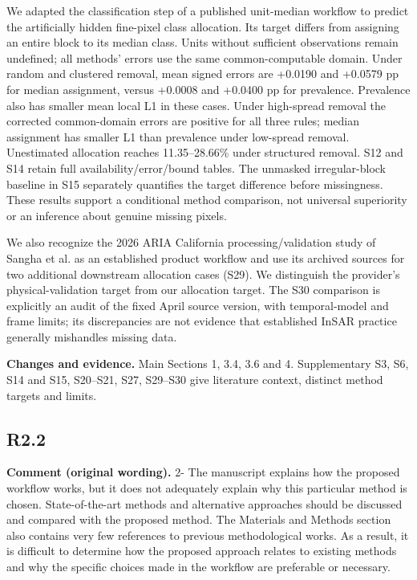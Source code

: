 \documentclass[11pt,a4paper]{article}
\begin{document}
We adapted the classification step of a published unit-median workflow to predict the artificially hidden fine-pixel class allocation. Its target differs from assigning an entire block to its median class. Units without sufficient observations remain undefined; all methods' errors use the same common-computable domain. Under random and clustered removal, mean signed errors are +0.0190 and +0.0579 pp for median assignment, versus +0.0008 and +0.0400 pp for prevalence. Prevalence also has smaller mean local L1 in these cases. Under high-spread removal the corrected common-domain errors are positive for all three rules; median assignment has smaller L1 than prevalence under low-spread removal. Unestimated allocation reaches 11.35--28.66\% under structured removal. S12 and S14 retain full availability/error/bound tables. The unmasked irregular-block baseline in S15 separately quantifies the target difference before missingness. These results support a conditional method comparison, not universal superiority or an inference about genuine missing pixels.

We also recognize the 2026 ARIA California processing/validation study of Sangha et al. as an established product workflow and use its archived sources for two additional downstream allocation cases (S29). We distinguish the provider's physical-validation target from our allocation target. The S30 comparison is explicitly an audit of the fixed April source version, with temporal-model and frame limits; its discrepancies are not evidence that established InSAR practice generally mishandles missing data.

\textbf{Changes and evidence.} Main Sections 1, 3.4, 3.6 and 4. Supplementary S3, S6, S14 and S15, S20--S21, S27, S29--S30 give literature context, distinct method targets and limits.

\subsection*{R2.2}

\textbf{Comment (original wording).} 2- The manuscript explains how the proposed workflow works, but it does not adequately explain why this particular method is chosen. State-of-the-art methods and alternative approaches should be discussed and compared with the proposed method. The Materials and Methods section also contains very few references to previous methodological works. As a result, it is difficult to determine how the proposed approach relates to existing methods and why the specific choices made in the workflow are preferable or necessary.
\end{document}
